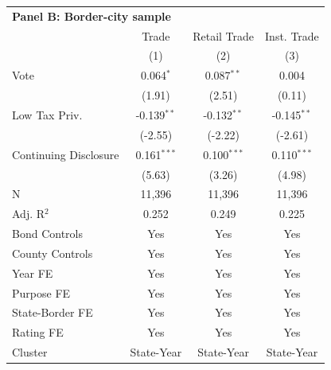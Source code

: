 \begingroup
\centering
\begin{tabular*}{\textwidth}{@{\extracolsep{\fill}}lccc}
\multicolumn{5}{l}{\textbf{Panel B: Border-city sample}}\\

\addlinespace
   \toprule
                         & Trade         & Retail Trade  & Inst. Trade\\  
                         & (1)           & (2)           & (3)\\  
   \midrule 
   Vote                  & 0.064$^{*}$   & 0.087$^{**}$  & 0.004\\   
                         & (1.91)       & (2.51)       & (0.11)\\   
   Low Tax Priv.         & -0.139$^{**}$ & -0.132$^{**}$ & -0.145$^{**}$\\   
                         & (-2.55)      & (-2.22)      & (-2.61)\\   
   Continuing Disclosure & 0.161$^{***}$ & 0.100$^{***}$ & 0.110$^{***}$\\   
                         & (5.63)       & (3.26)       & (4.98)\\   
   \hline
   N          & 11,396        & 11,396        & 11,396\\  
   Adj. R$^2$        & 0.252         & 0.249         & 0.225\\  
   Bond Controls         & Yes           & Yes           & Yes\\  
   County Controls       & Yes           & Yes           & Yes\\  
   Year FE               & Yes           & Yes           & Yes\\  
   Purpose FE            & Yes           & Yes           & Yes\\  
   State-Border FE       & Yes           & Yes           & Yes\\  
   Rating FE             & Yes           & Yes           & Yes\\  
   Cluster              & State-Year & State-Year & State-Year\\  
   \bottomrule
\end{tabular*}
\par\endgroup
